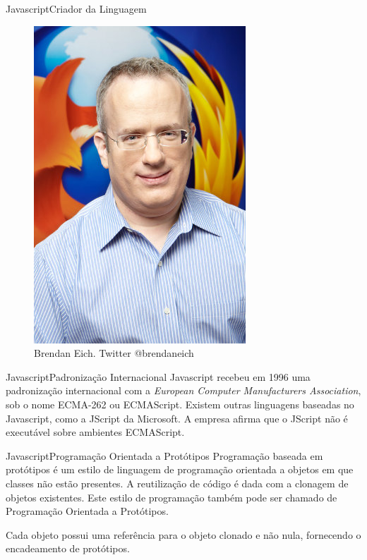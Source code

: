 \documentclass[hyperref={pdfpagelabels=false}]{beamer}
\begin{document}
\begin{frame}{Javascript}{Criador da Linguagem}
    \begin{figure}
        \includegraphics[scale=0.35]{brendan-eich}
        \caption{Brendan Eich. Twitter @brendaneich}
    \end{figure}
\end{frame}

\begin{frame}{Javascript}{Padronização Internacional}
    Javascript recebeu em 1996 uma padronização internacional\cite{history} com
    a \emph{European Computer Manufacturers Association}, sob o nome ECMA-262 ou
    ECMAScript. Existem outras linguagens baseadas no Javascript, como a JScript
    da Microsoft\cite{diff}. A empresa afirma que o JScript não é executável
    sobre ambientes ECMAScript\cite{wikipedia}.
\end{frame}

\begin{frame}{Javascript}{Programação Orientada a Protótipos}
    Programação baseada em protótipos\cite{prototype} é um estilo de linguagem
    de programação orientada a objetos em que classes não estão presentes. A
    reutilização de código é dada com a clonagem de objetos existentes. Este
    estilo de programação também pode ser chamado de Programação Orientada a
    Protótipos\cite{prototype}.

    Cada objeto possui uma referência para o objeto clonado e não nula,
    fornecendo o encadeamento de protótipos\cite{ecma}.
\end{frame}
\end{document}
